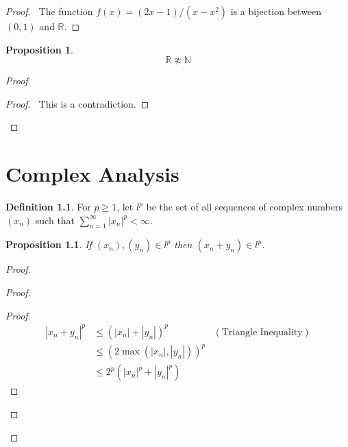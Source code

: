 \documentclass{book}
\let\qed\relax
\newtheorem{prop}[ax]{Proposition}
\theoremstyle{definition}
\newtheorem{df}[ax]{Definition}
\begin{document}
\begin{proof}
\pf\ The function $f(x) = (2x-1)/(x-x^2)$ is a bijection between $(0,1)$ and $\mathbb{R}$. \qed
\end{proof}

\begin{prop}
\[ \mathbb{R} \not\approx \mathbb{N} \]
\end{prop}

\begin{proof}
\pf
{}
\qedstep
\begin{proof}
	\pf\ This is a contradiction.
\end{proof}
\qed
\end{proof}

\chapter{Complex Analysis}

\begin{df}
For $p \geq 1$, let $l^p$ be the set of all sequences of complex numbers $(x_n)$ such that $\sum_{n=1}^\infty |x_n|^p < \infty$.
\end{df}

\begin{prop}
\label{prop:lp_closed_under_addition}
If $(x_n), (y_n) \in l^p$ then $(x_n + y_n) \in l^p$.
\end{prop}

\begin{proof}
\pf
{}
\begin{proof}
	\pf
	\begin{proof}
		\pf
		\begin{align*}
			|x_n + y_n|^p & \leq (|x_n| + |y_n|)^p & (\text{Triangle Inequality}) \\
			& \leq (2 \max(|x_n|,|y_n|))^p \\
			& \leq 2^p (|x_n|^p + |y_n|^p)
		\end{align*}
	\end{proof}
\end{proof}
\qed
\end{proof}
\end{document}
